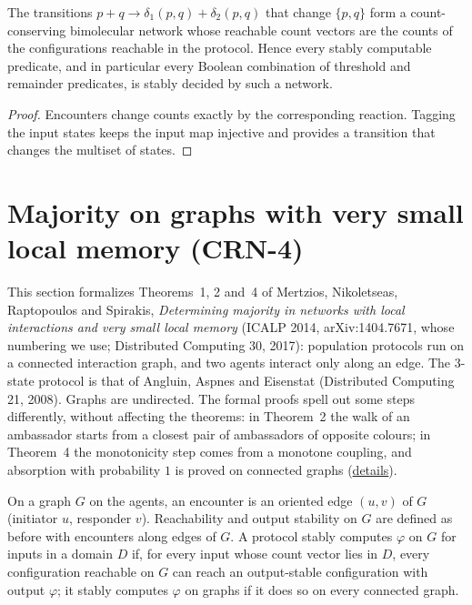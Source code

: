 \begin{theorem}\label{thm:transfer}
\leanok{}
The transitions $p + q \to \delta_1(p, q) + \delta_2(p, q)$ that change $\{p, q\}$ form a
count-conserving bimolecular network whose reachable count vectors are the counts of the
configurations reachable in the protocol. Hence every stably computable predicate, and in
particular every Boolean combination of threshold and remainder predicates, is stably decided by
such a network.
\end{theorem}
\begin{proof}\leanok
Encounters change counts exactly by the corresponding reaction. Tagging the input states keeps
the input map injective and provides a transition that changes the multiset of states.
\end{proof}

\section{Majority on graphs with very small local memory (CRN-4)}\label{sec:mnrs-graph-majority}
This section formalizes Theorems~1, 2 and~4 of Mertzios, Nikoletseas, Raptopoulos and Spirakis,
\emph{Determining majority in networks with local interactions and very small local memory}
(ICALP 2014, arXiv:1404.7671, whose numbering we use; Distributed Computing 30, 2017): population
protocols run on a connected interaction graph, and two agents interact only along an edge. The
3-state protocol is that of Angluin, Aspnes and Eisenstat (Distributed Computing 21, 2008).
Graphs are undirected. The formal proofs spell out some steps differently, without affecting the
theorems: in Theorem~2 the walk of an ambassador starts from a closest pair of ambassadors of
opposite colours; in Theorem~4 the monotonicity step comes from a monotone coupling, and
absorption with probability $1$ is proved on connected graphs
(\href{https://github.com/formal-dynamics/leanamics/blob/main/crn/FORMALIZATION_DIFFERENCES.md#majority-on-graphs-with-very-small-local-memory-graphmajority-crn-4}{details}).

\begin{definition}\label{def:graph-stable}
\leanok{}
On a graph $G$ on the agents, an encounter is an oriented edge $(u, v)$ of $G$ (initiator $u$,
responder $v$). Reachability and output stability on $G$ are defined as before with encounters
along edges of $G$. A protocol stably computes $\varphi$ on $G$ for inputs in a domain $D$ if, for
every input whose count vector lies in $D$, every configuration reachable on $G$ can reach an
output-stable configuration with output $\varphi$; it stably computes $\varphi$ on graphs if it
does so on every connected graph.
\end{definition}

